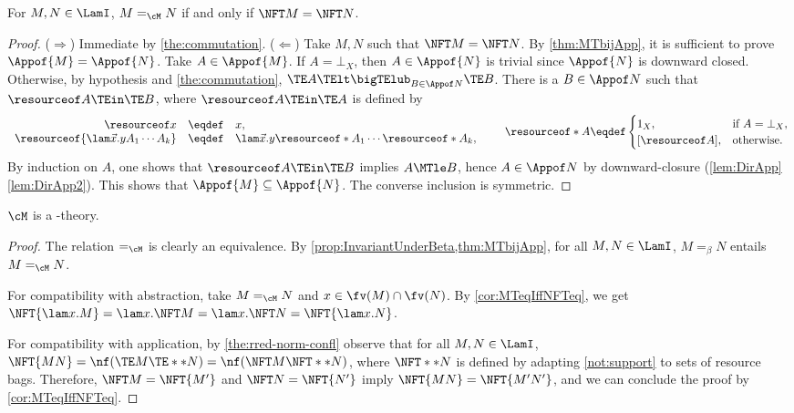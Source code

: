 \begin{corollary} \label{cor:MTeqIffNFTeq}
	For $M,N\in\LamI$, $M =_\cM N$ if and only if $\NFT M = \NFT N$.
\end{corollary}
	\begin{proof}
	($\Rightarrow$)
	Immediate by \cref{the:commutation}.
	($\Leftarrow$)
	Take $M,N$ such that $\NFT M = \NFT N$. 
	By \cref{thm:MTbijApp}, it is sufficient to prove 
	$\Appof{M} = \Appof{N}$.
	Take $A\in\Appof{M}$. 
	If $A = \bot_X$, then $A \in \Appof{N}$ is trivial 
		since $\Appof{N}$ is downward closed.
	Otherwise, by hypothesis and \cref{the:commutation},
		$\TE A \TElt \bigTElub_{B \in \Appof N} \TE  B$.
		There is a $B \in \Appof N$ such that
		$\resourceof A \TEin \TE B$,
		where $\resourceof A \TEin \TE A$ is defined by
		\[
		\begin{array}{rcl}
		\resourceof x &\eqdef& x,\\
\resourceof{\lam \vec{x}.yA_1\cdots A_k} &\eqdef&
			\lam \vec{x}.y\resourceof*{A_1}\cdots \resourceof*{A_k},\\	
		\end{array}
		\qquad
		\resourceof*{A} \eqdef
		\begin{cases}
		1_X,&\textrm{if }A = \bot_X,\\
		{[\resourceof A]},&\textrm{otherwise}.
		\end{cases}
		\]
		By induction on $A$, one shows that
		$\resourceof A \TEin \TE B$ implies $A \MTle B$,
		hence $A \in \Appof N$ by downward-closure
		(\cref{lem:DirApp}\eqref{lem:DirApp2}).
	This shows that $\Appof{M} \subseteq \Appof{N}$.
	The converse inclusion is symmetric.
	\end{proof}

\begin{corollary}\label{cor:MisALamITheory} 
	$\cM$ is a \lamI-theory.
\end{corollary}

\begin{proof}
	The relation $=_\cM$ is clearly an equivalence.
	By \cref{prop:InvariantUnderBeta,thm:MTbijApp}, 
	for all $M,N\in\LamI$, $M =_\beta N$ entails $M =_\cM N$.
	
	For compatibility with abstraction, 
	take $M =_\cM N$ and $x \in \fv(M) \cap \fv(N)$. 
	By \cref{cor:MTeqIffNFTeq}, we get 
	$\NFT{\lam x.M} = \lam x.\NFT M = \lam x.\NFT N = \NFT{\lam x.N}$.
	
	For compatibility with application, 
	by \cref{the:rred-norm-confl} observe that for all $M,N \in \LamI$, 
	$\NFT{MN} = \nf(\TE M \TE** N) = \nf(\NFT M \NFT** N)$,
	where $\NFT** N$ is defined by adapting
	\cref{not:support} to sets of resource bags.
	Therefore, $\NFT M = \NFT{M'}$ and $\NFT N = \NFT{N'}$ 
	imply $\NFT{MN} = \NFT{M'N'}$, and
	we can conclude the proof by \cref{cor:MTeqIffNFTeq}.
\end{proof}
